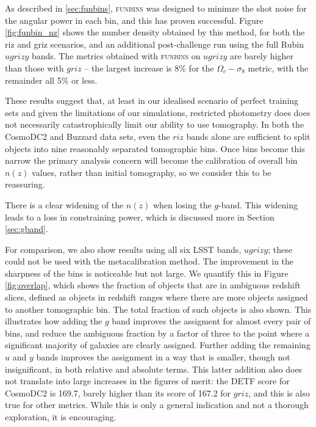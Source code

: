 \documentclass[twocolumn,twocolappendix]{aastex63}
\begin{document}
As described in \autoref{sec:funbins},  \textsc{funbins} was designed
to minimze the shot noise for the angular power in each bin, and this has proven successful. 
Figure \ref{fig:funbin_nz} shows the number density obtained by this method, for both the riz and griz 
scenarios, and an additional post-challenge run using the full Rubin $ugrizy$ bands.  The metrics
obtained with \textsc{funbins} on $ugrizy$ are barely higher than those with $griz$ -- the largest
increase is 8\% for the $\Omega_c-\sigma_8$ metric, with the remainder all 5\% or less.

These results suggest that, at least in our idealised scenario of perfect training sets and given the limitations of our simulations, restricted photometry does does not necessarily catastrophically limit our ability to use tomography.
In both the CosmoDC2 and Buzzard data sets,
even the $riz$ bands alone are sufficient to split objects into nine reasonably separated
tomographic bins.  Once bins become this narrow the primary analysis concern will become the calibration 
of overall bin $n(z)$ values, rather than initial tomography, so we consider this to be reassuring.

There is a clear widening of the $n(z)$ when losing the $g$-band.  This widening leads to a loss in 
constraining power, which is discussed more in Section \ref{sec:gband}.

For comparison, we also show results using all six LSST bands, $ugrizy$; these could not be used
with the metacalibration method. The improvement in the sharpness of the bins is noticeable but not large.
We quantify this in Figure \ref{fig:overlap}, which shows the fraction of objects that are in ambiguous
redshift slices, defined as objects in redshift ranges where there are more objects assigned to another 
tomographic bin.  The total fraction of such objects is also shown. This illustrates how adding the $g$ band 
improves the assigment
for almost every pair of bins, and reduce the ambiguous fraction by a factor of three to the 
point where a significant majority of galaxies are clearly assigned.  Further adding the remaining $u$ and $y$
bands improves the assignment in a way that is smaller, though not insignificant, in both relative and absolute terms.
This latter addition also does not translate into large increases in the figures of merit: the 
DETF score for CosmoDC2 is 169.7, barely higher than its score of 167.2 for $griz$, and this is also true for other 
metrics.   While this is only a general indication and not a thorough exploration, it is encouraging.
\end{document}

